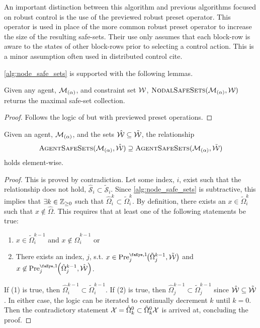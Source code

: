 \begin{remark}
An important distinction between this algorithm and previous algorithms focused on robust control is the use of the previewed robust preset operator. This operator is used in place of the more common robust preset operator to increase the size of the resulting safe-sets. Their use only assumes that each block-row is aware to the states of other block-rows prior to selecting a control action. This is a minor assumption often used in distributed control \alert{cite}.
\end{remark}
\autoref{alg:node_safe_sets} is supported with the following lemmas. 
\begin{lemma}
Given any agent, $\mathcal{M}_{(\alpha)}$, and constraint set $\wcon$, $\Call{NodalSafeSets}{\agent{\agentidx},\wcon}$ returns the maximal safe-set collection.
\end{lemma}
\begin{proof}
Follows the logic of \cite[Theorem 2]{Danielson2019} but with previewed preset operations.
\end{proof}
\begin{lemma}
Given an agent, $\mathcal{M}_{(\alpha)}$, and the sets $\hat\wcon\subseteq\tilde\wcon$, the relationship{\small
$$\Call{AgentSafeSets}{\agent{\agentidx},\hat\wcon}\supseteq\Call{AgentSafeSets}{\agent{\agentidx},\tilde\wcon}$$}
holds element-wise. 
\end{lemma}
\begin{proof}
This is proved by contradiction. Let some index, $i$, exist such that the relationship does not hold, $\hat{\mathcal{S}}_i\subset\tilde{\mathcal{S}}_i$. Since \autoref{alg:node_safe_sets} is subtractive, this implies that $\exists k\in\mathbb{Z}_{\geq 0}$ such that $\hat{\Omega}^k_i\subset\tilde{\Omega}^k_i$. By definition, there exists an $x\in\tilde{\Omega}^k_i$ such that $x\not\in\hat{\Omega}$. This requires that at least one of the following statements be true:
\begin{enumerate}
\item $x\in\tilde{\Omega}^{k-1}_i$ and $x\not\in\hat{\Omega}^{k-1}_i$ or
\item There exists an index, $j$, s.t. $x\in\PreviewedPre[j][1]{\tilde{\Omega}^{k-1}_j,\tilde{\mathcal{W}}}$ and $x\not\in\PreviewedPre[j][1]{\hat{\Omega}^{k-1}_j,\hat{\mathcal{W}}}$.
\end{enumerate}
If (1) is true, then $\hat{\Omega}^{k-1}_i\subset\tilde{\Omega}^{k-1}_i$. If (2) is true, then $\hat{\Omega}^{k-1}_j\subset\tilde{\Omega}^{k-1}_j$ since $\hat\wcon\subseteq\tilde\wcon$. In either case, the logic can be iterated to continually decrement $k$ until $k=0$. Then the contradictory statement $\xcon = \hat\Omega^0_k\subset\tilde{\Omega}^0_k\xcon$ is arrived at, concluding the proof. 
\end{proof}

